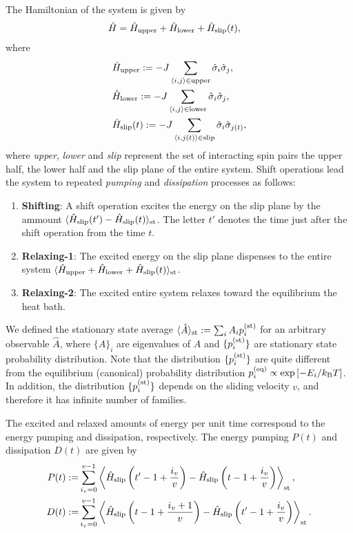 The Hamiltonian of the system is given by
\begin{align}
&\hat{H}=\hat{H}_{\rm upper} + \hat{H}_{\rm lower} + \hat{H}_{\rm slip}(t),
\end{align}
where
\begin{align}
&\hat{H}_{\rm upper}:=-J\sum_{\langle i,j\rangle\in\mathrm{upper}}\hat{\sigma}_{i}\hat{\sigma}_{j}\label{ham:upper}, \\
&\hat{H}_{\rm lower}:=-J\sum_{\langle i,j\rangle\in\mathrm{lower}}\hat{\sigma}_{i}\hat{\sigma}_{j}\label{ham:lower}, \\
&\hat{H}_{\rm slip}(t):=-J\sum_{\langle i,j(t)\rangle\in\mathrm{slip}}\hat{\sigma}_{i}\hat{\sigma}_{j(t)}\label{ham:slip},
\end{align}
where \textit{upper}, \textit{lower} and \textit{slip} represent the set of interacting spin pairs the upper half, the lower half and the slip plane of the entire system.
Shift operations lead the system to repeated \textit{pumping} and \textit{dissipation} processes as follows:
\begin{enumerate}
	\item \textbf{Shifting}: A shift operation excites the energy on the slip plane by the ammount $\langle\hat{H}_{\rm slip}(t')-\hat{H}_{\rm slip}(t)\rangle_{\rm st}$. The letter $t'$ denotes the time just after the shift operation from the time $t$.
	\item \textbf{Relaxing-1}: The excited energy on the slip plane dispenses to the entire system $\langle\hat{H}_{\rm upper} + \hat{H}_{\rm lower} + \hat{H}_{\rm slip}(t)\rangle_{\rm st}$.
	\item \textbf{Relaxing-2}: The excited entire system relaxes toward the equilibrium the heat bath.
\end{enumerate}
We defined the stationary state average $\langle\hat{A}\rangle_{\rm st}:=\sum_{i}A_{i}p^{(\rm st)}_{i}$ for an arbitrary observable $\hat{A}$, where $\{A\}_{i}$ are eigenvalues of $\hat{A}$ and $\{p^{(\rm st)}_{i}\}$ are stationary state probability distribution. Note that the distribution $\{p^{(\rm st)}_{i}\}$ are quite different from the equilibrium (canonical) probability distribution $p^{(\rm eq)}_{i}\propto\exp\left[-E_{i}/k_{\rm B} T\right]$. In addition, the distribution $\{p^{(\rm st)}_{i}\}$ depends on the sliding velocity $v$, and therefore it has infinite number of families. 

The excited and relaxed amounts of energy per unit time correspond to the energy pumping and dissipation, respectively. The energy pumping $P(t)$ and dissipation $D(t)$ are given by
\begin{align}
P(t):=&\sum_{i_{v}=0}^{v-1}\left\langle \hat{H}_{\rm slip}\left(t'-1+\frac{i_{v}}{v}\right) - \hat{H}_{\rm slip}\left(t-1+\frac{i_{v}}{v}\right)\right\rangle_{\rm st},\\
D(t):=&\sum_{i_{v}=0}^{v-1}\left\langle \hat{H}_{\rm slip}\left(t-1+\frac{i_{v}+1}{v}\right) - \hat{H}_{\rm slip}\left(t'-1+\frac{i_{v}}{v}\right)\right\rangle_{\rm st}.
\end{align}

